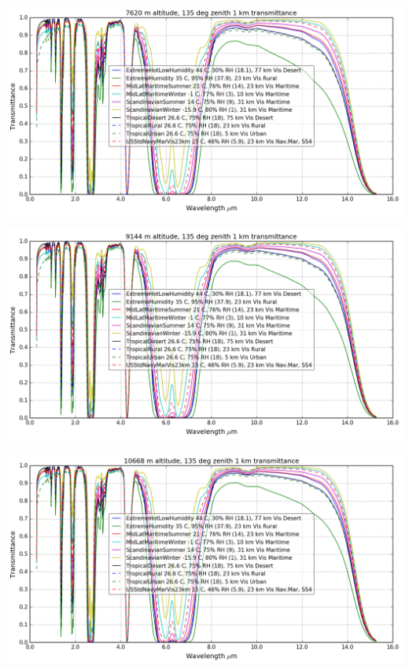 \documentclass{workpackage}
\begin{document}
\begin{center}
\includegraphics{./pic/Analyse-Standard-Atmospheres_17_16.png}
\end{center}

\begin{center}
\includegraphics{./pic/Analyse-Standard-Atmospheres_17_17.png}
\end{center}

\begin{center}
\includegraphics{./pic/Analyse-Standard-Atmospheres_17_18.png}
\end{center}
\end{document}
